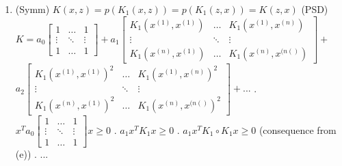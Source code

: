 \begin{answer}
\begin{enumerate}
\item 
\subitem  (Symm) $K(x,z) = p(K_1(x, z)) = p(K_1(z, x))= K(z,x)$
\subitem (PSD) $
K = 
a_0\begin{bmatrix}
    1 & \dots  & 1 \\
    \vdots & \ddots & \vdots \\
    1 & \dots  & 1
\end{bmatrix} + 
a_1\begin{bmatrix}
    K_1(x^{(1)},x^{(1)}) & \dots  & K_1(x^{(1)},x^{(n)})  \\
    \vdots & \ddots & \vdots \\
    K_1(x^{(n)},x^{(1)})  & \dots  & K_1(x^{(n)},x^{(n()}) 
\end{bmatrix} + $ \\
$
a_2\begin{bmatrix}
    K_1(x^{(1)},x^{(1)})^2 & \dots  & K_1(x^{(1)},x^{(n)})^2  \\
    \vdots & \ddots & \vdots \\
    K_1(x^{(n)},x^{(1)})^2  & \dots  & K_1(x^{(n)},x^{(n()})^2
\end{bmatrix}   + ...
$
. $x^Ta_0\begin{bmatrix}
    1 & \dots  & 1 \\
    \vdots & \ddots & \vdots \\
    1 & \dots  & 1
\end{bmatrix}x \ge 0 $
. $a_1 x^T K_1 x \ge 0$
. $a_1 x^T K_1 \circ K_1 x \ge 0$ (consequence from (e))
. ...

\end{enumerate}


\end{answer}
